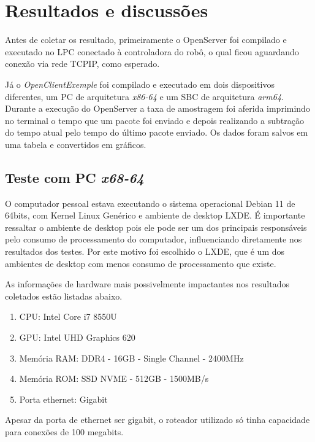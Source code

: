 \chapter{Resultados e discussões}
    \label{chp:Resultados}
    
    Antes de coletar os resultado, primeiramente o OpenServer foi compilado e executado no \ac{LPC} conectado à controladora do robô, o qual ficou aguardando conexão via rede \ac{TCPIP}, como esperado.
    
    Já o \textit{OpenClientExemple} foi compilado e executado em dois dispositivos diferentes, um \ac{PC} de arquitetura \textit{x86-64} e um \ac{SBC} de arquitetura \textit{arm64}. Durante a execução do OpenServer a taxa de amostragem foi aferida imprimindo no terminal o tempo que um pacote foi enviado e depois realizando a subtração do tempo atual pelo tempo do último pacote enviado. Os dados foram salvos em uma tabela e convertidos em gráficos.
    
    \section{Teste com PC \textit{x68-64}}
    
        O computador pessoal estava executando o sistema operacional Debian 11 de 64bits, com Kernel Linux Genérico e ambiente de desktop LXDE. É importante ressaltar o ambiente de desktop pois ele pode ser um dos principais responsáveis pelo consumo de processamento do computador, influenciando diretamente nos resultados dos testes. Por este motivo foi escolhido o LXDE, que é um dos ambientes de desktop com menos consumo de processamento que existe.
        
        As informações de hardware mais possivelmente impactantes nos resultados coletados estão listadas abaixo.
        \begin{enumerate}
            \item CPU: Intel Core i7 8550U
            \item GPU: Intel UHD Graphics 620
            \item Memória RAM: DDR4 - 16GB - Single Channel - 2400MHz
            \item Memória ROM: SSD NVME - 512GB - 1500MB/s
            \item Porta ethernet: Gigabit
        \end{enumerate}
        
        Apesar da porta de ethernet ser gigabit, o roteador utilizado só tinha capacidade para conexões de 100 megabits.
        
